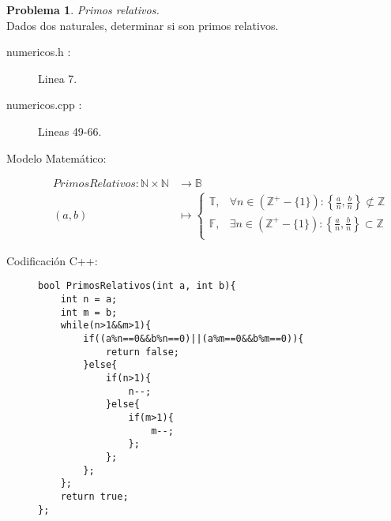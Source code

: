 \documentclass{article}
\theoremstyle{plain}
\theoremstyle{definition}
\newtheorem{problem}{Problema}
\begin{document}
\begin{problem} \emph{Primos relativos.}\\
\hspace*{7mm}Dados dos naturales, determinar si son primos relativos.
%
\begin{description}
\item[numericos.h :] Linea 7. \item[numericos.cpp :] Lineas 49-66.

\item[Modelo Matemático:]
\begin{align*}
PrimosRelativos: \mathbb{N}\times\mathbb{N} &\to \mathbb{B}\\
(a,b) &\mapsto \begin{cases}
\mathbb{T},& \forall n \in \left(\mathbb{Z^{+}}-\lbrace{1}\rbrace\right):\left\lbrace\frac{a}{n},\frac{b}{n}\right\rbrace \not\subset \mathbb{Z}\\
\mathbb{F},& \exists n \in \left(\mathbb{Z^{+}}-\lbrace{1}\rbrace\right):\left\lbrace\frac{a}{n},\frac{b}{n}\right\rbrace \subset \mathbb{Z}\\
\end{cases}
\end{align*}
%
\item[Codificación \textsf{C++}:]\hfill
%
\begin{verbatim}
bool PrimosRelativos(int a, int b){
    int n = a;
    int m = b;
    while(n>1&&m>1){
        if((a%n==0&&b%n==0)||(a%m==0&&b%m==0)){
            return false;
        }else{
            if(n>1){
                n--;
            }else{
                if(m>1){
                    m--;
                };
            };
        };
    };
    return true;
};
\end{verbatim}
\end{description}
\end{problem}
\end{document}
